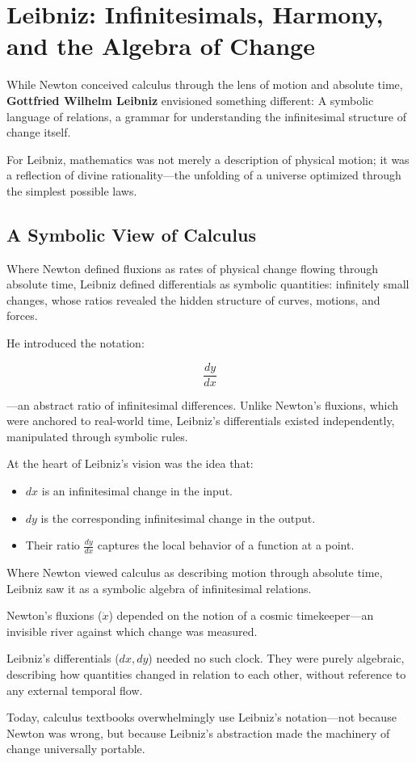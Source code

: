 \section{Leibniz: Infinitesimals, Harmony, and the Algebra of Change}

While Newton conceived calculus through the lens of motion and absolute time, \textbf{Gottfried Wilhelm Leibniz} envisioned something different:  
A symbolic language of relations, a grammar for understanding the infinitesimal structure of change itself.

For Leibniz, mathematics was not merely a description of physical motion; it was a reflection of divine rationality—the unfolding of a universe optimized through the simplest possible laws.

\subsection{A Symbolic View of Calculus}

Where Newton defined fluxions as rates of physical change flowing through absolute time, Leibniz defined differentials as symbolic quantities: infinitely small changes, whose ratios revealed the hidden structure of curves, motions, and forces.

He introduced the notation:

\[
\frac{dy}{dx}
\]

—an abstract ratio of infinitesimal differences. Unlike Newton’s fluxions, which were anchored to real-world time, Leibniz's differentials existed independently, manipulated through symbolic rules.

At the heart of Leibniz’s vision was the idea that:

\begin{itemize}
    \item \( dx \) is an infinitesimal change in the input.
    \item \( dy \) is the corresponding infinitesimal change in the output.
    \item Their ratio \( \frac{dy}{dx} \) captures the local behavior of a function at a point.
\end{itemize}

\begin{tcolorbox}[colback=gray!5!white, colframe=black, title=\textbf{Historical Sidebar: Leibniz’s Notation vs Newton’s Fluxions}, fonttitle=\bfseries, arc=1.5mm, boxrule=0.4pt]
Where Newton viewed calculus as describing motion through absolute time, Leibniz saw it as a symbolic algebra of infinitesimal relations.

Newton's fluxions (\( \dot{x} \)) depended on the notion of a cosmic timekeeper—an invisible river against which change was measured.

Leibniz’s differentials (\( dx, dy \)) needed no such clock. They were purely algebraic, describing how quantities changed in relation to each other, without reference to any external temporal flow.

Today, calculus textbooks overwhelmingly use Leibniz’s notation—not because Newton was wrong, but because Leibniz’s abstraction made the machinery of change universally portable.
\end{tcolorbox}

